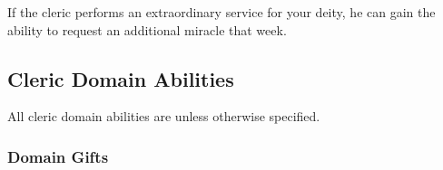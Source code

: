         If the cleric performs an extraordinary service for your deity, he can gain the ability to request an additional miracle that week.

    \subsection{Cleric Domain Abilities}
        All cleric domain abilities are  unless otherwise specified.

        \subsubsection{Domain Gifts}\label{Domain Gifts}

